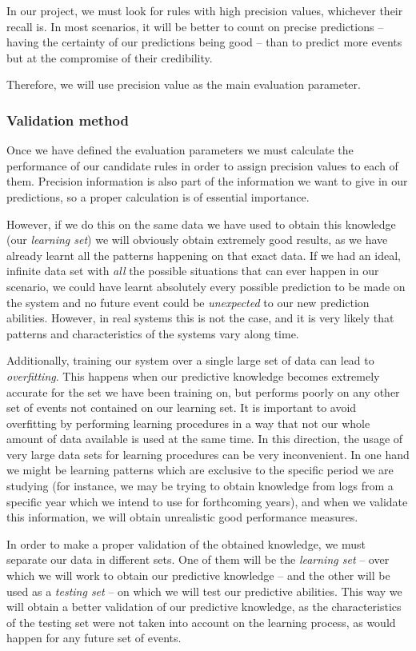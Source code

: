 In our project, we must look for rules with high precision values, whichever their recall is. In most scenarios, it will be better to count on precise predictions -- having the certainty of our predictions being good -- than to predict more events but at the compromise of their credibility.

Therefore, we will use precision value as the main evaluation parameter.

\subsubsection{Validation method}
Once we have defined the evaluation parameters we must calculate the performance of our candidate rules in order to assign precision values to each of them. Precision information is also part of the information we want to give in our predictions, so a proper calculation is of essential importance.

However, if we do this on the same data we have used to obtain this knowledge (our \emph{learning set}) we will obviously obtain extremely good results, as we have already learnt all the patterns happening on that exact data. If we had an ideal, infinite data set with \emph{all} the possible situations that can ever happen in our scenario, we could have learnt absolutely every possible prediction to be made on the system and no future event could be \emph{unexpected} to our new prediction abilities. However, in real systems this is not the case, and it is very likely that patterns and characteristics of the systems vary along time. 

Additionally, training our system over a single large set of data can lead to \emph{overfitting}. This happens when our predictive knowledge becomes extremely accurate for the set we have been training on, but performs poorly on any other set of events not contained on our learning set. It is important to avoid overfitting by performing learning procedures in a way that not our whole amount of data available is used at the same time. In this direction, the usage of very large data sets for learning procedures can be very inconvenient. In one hand we might be learning patterns which are exclusive to the specific period we are studying (for instance, we may be trying to obtain knowledge from logs from a specific year which we intend to use for forthcoming years), and when we validate this information, we will obtain unrealistic good performance measures.

In order to make a proper validation of the obtained knowledge, we must separate our data in different sets. One of them will be the \emph{learning set} -- over which we will work to obtain our predictive knowledge -- and the other will be used as a \emph{testing set} -- on which we will test our predictive abilities. This way we will obtain a better validation of our predictive knowledge, as the characteristics of the testing set were not taken into account on the learning process, as  would happen for any future set of events.

